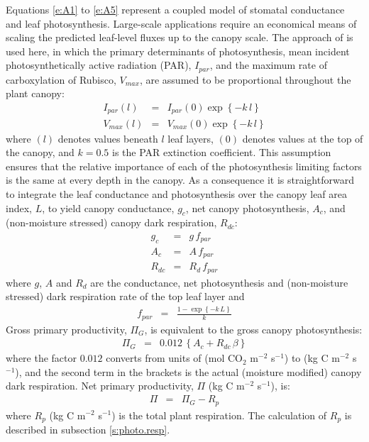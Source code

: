 \documentclass[a4paper]{article}
\begin{document}
Equations \eqref{e:A1} to \eqref{e:A5} represent a coupled model of
stomatal conductance and leaf photosynthesis. Large-scale applications
require an economical means of scaling the predicted leaf-level fluxes
up to the canopy scale. The approach of \citet{Sel92ii} is used here,
in which the primary determinants of photosynthesis, mean incident
photosynthetically active radiation (PAR), $I_{par}$, and the maximum
rate of carboxylation of Rubisco, $V_{max}$, are assumed to be
proportional throughout the plant canopy:
\begin{eqnarray}
I_{par}(l) &=& I_{par}(0) \exp\left\{-k \, l \right\} \label{e:A6} \\ 
V_{max}(l) &=& V_{max}(0) \exp\left\{-k \, l \right\}  \label{e:A7}
\end{eqnarray}
where $(l)$ denotes values beneath $l$ leaf layers, $(0)$ denotes
values at the top of the canopy, and $k=0.5$ is the PAR extinction
coefficient.  This assumption ensures that the relative importance of
each of the photosynthesis limiting factors is the same at every depth
in the canopy. As a consequence it is straightforward to integrate the
leaf conductance and photosynthesis over the canopy leaf area index,
$L$, to yield canopy conductance, $g_{c}$, net canopy photosynthesis,
$A_{c}$, and (non-moisture stressed) canopy dark respiration,
$R_{dc}$:
\begin{eqnarray} 
g_{c} &=& g \, f_{par} \label{e:A8} \\
A_{c} &=& A \, f_{par} \label{e:A9} \\
R_{dc} &=& R_{d} \, f_{par} \label{e:A10}
\end{eqnarray}
where $g$, $A$ and $R_{d}$ are the conductance, net photosynthesis and
(non-moisture stressed) dark respiration rate of the top leaf layer
and
\begin{eqnarray}
f_{par} &=& \frac{1-\exp \left\{-k \, L \right\}}{k}
\label{e:A11}
\end{eqnarray}
Gross primary productivity, $\Pi_{G}$, is equivalent to the gross
canopy photosynthesis:
\begin{eqnarray}
\Pi_{G} &=& 0.012 \, \left\{A_{c} + R_{dc} \, \beta\right\} 
\label{e:A12}
\end{eqnarray}
where the factor $0.012$ converts from units of (mol CO$_{2}$ m$^{-2}$
s$^{-1}$) to (kg C m$^{-2}$ s$^{-1}$), and the second term in the
brackets is the actual (moisture modified) canopy dark
respiration. Net primary productivity, $\Pi$ (kg C m$^{-2}$ s$^{-1}$),
is:
\begin{eqnarray}
\Pi &=& \Pi_{G} - R_{p}
\label{e:A13}
\end{eqnarray}
where $R_{p}$ (kg C m$^{-2}$ s$^{-1}$) is the total plant
respiration. The calculation of $R_{p}$ is described in subsection
\ref{s:photo.resp}.
\end{document}
